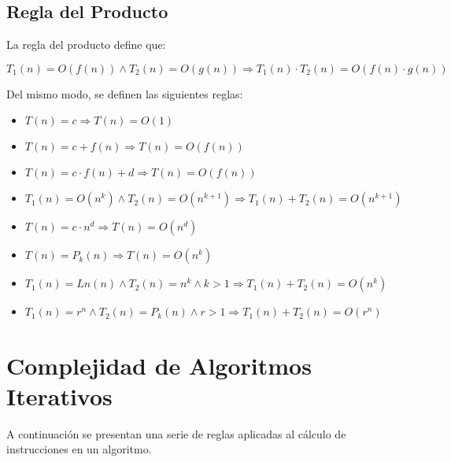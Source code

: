 \subsection{Regla del Producto}

La regla del producto define que:

$T_1(n) = O(f(n)) \wedge T_2(n) = O(g(n)) \Rightarrow T_1(n) \cdot T_2(n) = O(f(n) \cdot g(n))$

Del mismo modo, se definen las siguientes reglas:
\begin{itemize}
\item $T(n) = c \Rightarrow T(n) = O(1)$
\item $T(n) = c + f(n) \Rightarrow T(n) = O(f(n))$
\item $T(n) = c \cdot f(n) + d \Rightarrow T(n) = O(f(n))$
\item $T_1(n) = O(n^k) \wedge T_2(n) = O(n^{k+1}) \Rightarrow T_1(n) + T_2(n) = O(n^{k+1})$
\item $T(n) = c \cdot n^d \Rightarrow T(n) = O(n^d)$
\item $T(n) = P_k(n) \Rightarrow T(n) = O(n^k)$
\item $T_1(n) = Ln(n) \wedge T_2(n) = n^k \wedge k > 1 \Rightarrow T_1(n) + T_2(n) = O(n^k)$
\item $T_1(n) = r^n \wedge T_2(n) = P_k(n) \wedge r > 1 \Rightarrow T_1(n) + T_2(n) = O(r^n)$
\end{itemize}

\section{Complejidad de Algoritmos Iterativos}

A continuación se presentan una serie de reglas aplicadas al cálculo de instrucciones en un algoritmo.

